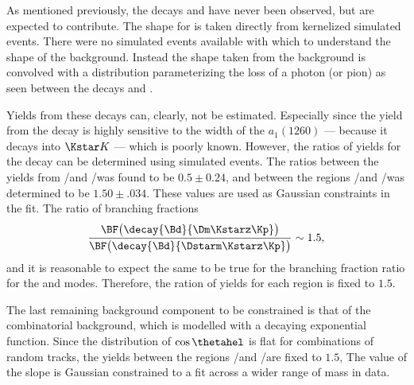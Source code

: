 As mentioned previously, the decays \bstodskstrk and \bstodsstrkstrk have never been observed, but
are expected to contribute.
The shape for \bstodskstrk is taken directly from kernelized simulated events.
There were no simulated events available with which to understand the shape of the \bstodsstrkstrk
background.
Instead the shape taken from the \bstodskstrk background is convolved with a distribution
parameterizing the loss of a photon (or pion) as seen between the decays \btodsstrphi and
\bstodskstrk.


Yields from these decays can, clearly, not be estimated.
Especially since the yield from the decay \bstodskstrk is highly sensitive to the width of the
$a_1(1260)$ --- because it decays into $\Kstar K$ --- which is poorly known.
However, the ratios of yields for the \bstodskstrk decay can be determined using simulated events.
The ratios between the yields from \rA/\rB and \rC/\rD was found to be $0.5\pm0.24$, and between the
regions \rA/\rC and \rB/\rD was determined to be $1.50\pm.034$.
These values are used as Gaussian constraints in the fit.
The ratio of branching fractions
\begin{equation}
  \frac{\BF\big(\decay{\Bd}{\Dm\Kstarz\Kp}\big)}
  {\BF\big(\decay{\Bd}{\Dstarm\Kstarz\Kp}\big)}
  \sim 1.5,
\end{equation}
and it is reasonable to expect the same to be true for the branching fraction ratio for the
\bstodskstrk and \bstodsstrkstrk modes.
Therefore, the ration of yields for each region is fixed to $1.5$.



The last remaining background component to be constrained is that of the combinatorial background,
which is modelled with a decaying exponential function.
Since the distribution of $\cos\thetahel$ is flat for combinations of random tracks, the yields
between the regions \rA/\rC and \rB/\rD  are fixed to $1.5$,
The value of the slope is Gaussian constrained to a fit across a wider range of mass in data.

